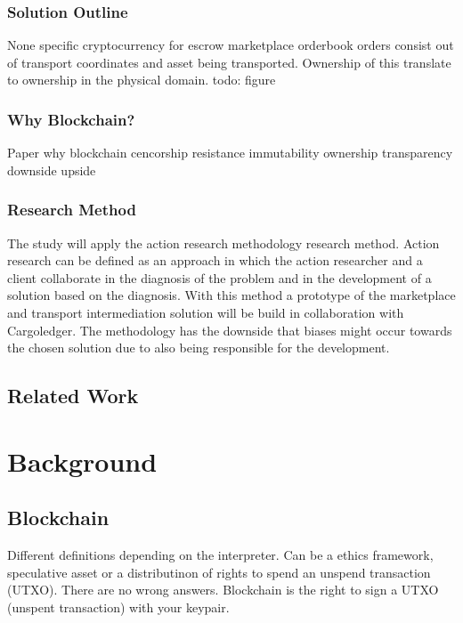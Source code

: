 \documentclass[Nomencl]{DylanMaster}
\begin{document}
\subsubsection{Solution Outline}

None specific cryptocurrency for escrow
marketplace orderbook orders consist out of transport coordinates and asset being transported. Ownership of this translate to ownership in the physical domain.
todo: figure

\subsubsection{Why Blockchain?}

Paper why blockchain
cencorship resistance
immutability
ownership
transparency
downside
upside

\subsubsection{Research Method}

The study will apply the action research methodology research method. Action research can be defined as an approach in which the action researcher and a client collaborate in the diagnosis of the problem and in the development of a solution based on the diagnosis. With this method a prototype of the marketplace and transport intermediation solution will be build in collaboration with Cargoledger. The methodology has the downside that biases might occur towards the chosen solution due to also being responsible for the development.\par

\subsection{Related Work}

\section{Background}

\subsection{Blockchain}

Different definitions depending on the interpreter. Can be a ethics framework, speculative asset or a distributinon of rights to spend an unspend transaction (UTXO). There are no wrong answers.
Blockchain is the right to sign a UTXO (unspent transaction) with your keypair.
\end{document}
